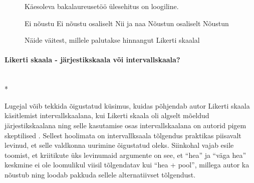 \documentclass[a4paper]{article}
\numberwithin{equation}{section}
\theoremstyle{definition}
\begin{document}
\vspace{10pt}

\begin{figure}[H]


\colorbox{background_example}{\parbox{\textwidth}{

\vspace{1mm}

Käesoleva bakalaureusetöö \"ulesehitus on loogiline.

\vspace{5pt}

\begin{Form}
\def\DefaultWidthofChoiceMenu{12pt}%



\ChoiceMenu[bordercolor = gray,disabled = true,name=optionE,radio,radiosymbol=\ding{108}]{\mbox{}}\null Ei nõustu 
\ChoiceMenu[bordercolor = gray,disabled = true,name=optionD,radio,radiosymbol=\ding{108}]{\mbox{}}\null Ei nõustu osaliselt
\ChoiceMenu[bordercolor = gray,disabled = true,name=optionC,radio,radiosymbol=\ding{108}]{\mbox{}}\null Nii ja naa
\ChoiceMenu[bordercolor = gray,disabled = true, name=optionB,radio,radiosymbol=\ding{108}]{\mbox{}}\null Nõustun osaliselt
\ChoiceMenu[bordercolor = gray,disabled = true,name=optionA,radio,radiosymbol=\ding{108}]{\mbox{}}\null Nõustun


\end{Form}}}
\caption{Näide väitest, millele palutakse hinnangut Likerti skaalal}
\label{likert_question}
\end{figure}

\paragraph{Likerti skaala -  järjestikskaala või intervallskaala?}\mbox{}\\*

Lugejal võib tekkida õigustatud k\"usimus, kuidas põhjendab autor Likerti skaala käsitlemist intervallskaalana, kui Likerti skaala oli algselt mõeldud järjestikskaalana ning  selle kasutamise osas intervallskaalana on autorid pigem skeptilised \cite{Jamieson2004}. Sellest hoolimata on intervallksaala tõlgendus praktikas piisavalt levinud, et selle valdkonna uurimine õigustatud oleks. Siinkohal vajab esile toomist, et kriitikute \"uks levinumaid argumente on see, et "`hea"'  ja "`väga hea"'  keskmine ei ole  loomulikul viisil tõlgendatav kui "`hea + pool"', millega autor ka nõustub ning loodab pakkuda sellele alternatiivset tõlgendust. 
\end{document}
